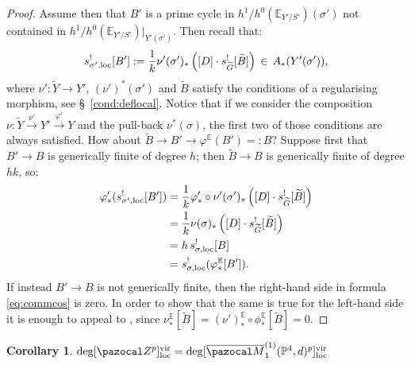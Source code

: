 \documentclass[11pt]{amsart}
\newcommand{\Mone}[3]{\overline{\pazocal M}^{(1)}_{#1}(#2,#3)}
\newcommand{\PP}{\mathbb P}
\renewcommand{\to}{\rightarrow}
\newcommand{\Z}{\pazocal Z}
\theoremstyle{plain}
\newtheorem{cor}[thm]{Corollary}
\theoremstyle{definition}
\begin{document}
\begin{proof}
Assume then that $B'$ is a prime cycle in $h^1/h^0(\mathbb{E}_{Y'/S'})(\sigma')$ not contained in $h^1/h^0(\mathbb{E}_{Y'/S'})\rvert_{Y'(\sigma')}$. Then recall that: 
 \[s^!_{\sigma',\rm{loc}}[B']:=\frac{1}{k} \nu'(\sigma')_*\left([D]\cdot s^!_{\widetilde{G}}[\widetilde{B}]\right)\,\in\,A_*(Y'(\sigma')),\]
 where $\nu'\colon \widetilde{Y}\to Y'$, $(\nu')^*(\sigma')$ and $\widetilde B$ satisfy the conditions of a regularising morphism, see \S~\ref{cond:deflocal}. Notice that if we consider the composition
 $\nu\colon \widetilde{Y}\xrightarrow{\nu'} Y'\xrightarrow{\varphi'} Y$ and the pull-back $\nu^*(\sigma)$, the first two of those conditions are always satisfied. How about
 $\widetilde{B}\to B'\to \varphi^{\mathbb{E}}(B')=:B?$
 Suppose first that $B'\to B$ is generically finite of degree $h$; then $\widetilde{B}\to B$ is  generically finite of degree $hk$, so:
 \begin{align*}
 \varphi'_*( s^!_{\sigma',\rm{loc}}[B'])&= \frac{1}{k}\varphi'_*\circ \nu'(\sigma')_*\left([D]\cdot s^!_{\widetilde{G}}[\widetilde{B}]\right)\\
 &=\frac{1}{k} \nu(\sigma)_*\left([D]\cdot s^!_{\widetilde{G}}[\widetilde{B}]\right)\\
 &=h\, s_{\sigma,\rm{loc}}^![B]\\
 &=s_{\sigma,\rm{loc}}^!(\varphi^{\mathbb{E}}_*[B']).
 \end{align*}
If instead $B'\to B$ is not generically finite, then the right-hand side in formula \eqref{eq:commcos} is zero. In order to show that the same is true for the left-hand side it is enough to appeal to \cite[Lemma~2.7]{KLcosection}, since $\nu_*^{\mathbb{E}}[\widetilde B]=(\nu')_*^{\mathbb E}\circ \phi^{\mathbb E}_*[\widetilde B]=0.$ %
\end{proof}

\begin{cor}\label{cor:Zp-vs-pfields}
$\deg[\Z^p]^{\rm{vir}}_{\rm{loc}}=\deg[\Mone{1}{\PP^4}{d}^p]^{\rm{vir}}_{\rm{loc}}$
\end{cor}
\end{document}
